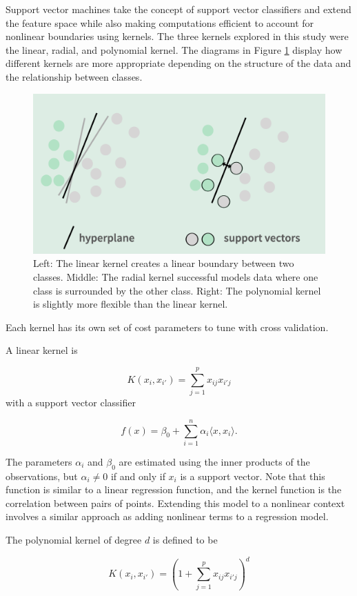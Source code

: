 \documentclass[12pt,twoside]{reedthesis}
\begin{document}
Support vector machines take the concept of support vector classifiers and extend the feature space while also making computations efficient to account for nonlinear boundaries using kernels. The three kernels explored in this study were the linear, radial, and polynomial kernel. The diagrams in Figure \ref{fig:diagrams} display how different kernels are more appropriate depending on the structure of the data and the relationship between classes.
\begin{figure}

{\centering \includegraphics[width=0.7\linewidth]{figure/hyperplane} 

}

\caption{Left: The linear kernel creates a linear boundary between two classes. Middle: The radial kernel successful models data where one class is surrounded by the other class. Right: The polynomial kernel is slightly more flexible than the linear kernel.}\label{fig:diagrams}
\end{figure}
Each kernel has its own set of cost parameters to tune with cross validation.

A linear kernel is

\[K(x_i, x_{i'}) = \sum_{j = 1}^p x_{ij}x_{i'j}\]
with a support vector classifier

\[f(x) = \beta_0 + \sum_{i = 1}^n \alpha_i \langle x, x_i \rangle.\]

The parameters \(\alpha_i\) and \(\beta_0\) are estimated using the inner products of the observations, but \(\alpha_i \neq 0\) if and only if \(x_i\) is a support vector. Note that this function is similar to a linear regression function, and the kernel function is the correlation between pairs of points. Extending this model to a nonlinear context involves a similar approach as adding nonlinear terms to a regression model.

The polynomial kernel of degree \(d\) is defined to be

\[K(x_i, x_{i'}) = \left( 1 + \sum_{j = 1}^p x_{ij}x_{i'j}\right)^d\]
\end{document}
